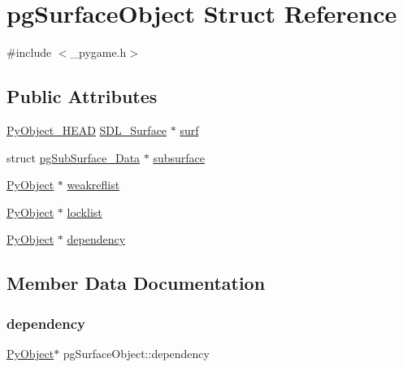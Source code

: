 \hypertarget{structpg_surface_object}{}\section{pg\+Surface\+Object Struct Reference}
\label{structpg_surface_object}


{\ttfamily \#include $<$\+\_\+pygame.\+h$>$}

\subsection*{Public Attributes}
\begin{DoxyCompactItemize}
\item 
\mbox{\hyperlink{_python27_2object_8h_a0bf35c1f3ea13f925de94d8593db3b7e}{Py\+Object\+\_\+\+H\+E\+AD}} \mbox{\hyperlink{struct_s_d_l___surface}{S\+D\+L\+\_\+\+Surface}} $\ast$ \mbox{\hyperlink{structpg_surface_object_abb9d6d94832d8c7ab74248354b2bf6cf}{surf}}
\item 
struct \mbox{\hyperlink{structpg_sub_surface___data}{pg\+Sub\+Surface\+\_\+\+Data}} $\ast$ \mbox{\hyperlink{structpg_surface_object_af88de874c2a9e1616104820e5050d979}{subsurface}}
\item 
\mbox{\hyperlink{_python27_2object_8h_aadc84ac7aed2cfa6f20c25f62bf3dac7}{Py\+Object}} $\ast$ \mbox{\hyperlink{structpg_surface_object_a1918eaf635affb55cbaccbffc0a75bcf}{weakreflist}}
\item 
\mbox{\hyperlink{_python27_2object_8h_aadc84ac7aed2cfa6f20c25f62bf3dac7}{Py\+Object}} $\ast$ \mbox{\hyperlink{structpg_surface_object_ac8e1e1eec4639dd65318ef954e73ef94}{locklist}}
\item 
\mbox{\hyperlink{_python27_2object_8h_aadc84ac7aed2cfa6f20c25f62bf3dac7}{Py\+Object}} $\ast$ \mbox{\hyperlink{structpg_surface_object_ac7fa0be13a9e38e00005d14b77a879b3}{dependency}}
\end{DoxyCompactItemize}


\subsection{Member Data Documentation}
\mbox{\label{structpg_surface_object_ac7fa0be13a9e38e00005d14b77a879b3}} 
\subsubsection{\texorpdfstring{dependency}{dependency}}
{\footnotesize\ttfamily \mbox{\hyperlink{_python27_2object_8h_aadc84ac7aed2cfa6f20c25f62bf3dac7}{Py\+Object}}$\ast$ pg\+Surface\+Object\+::dependency}

